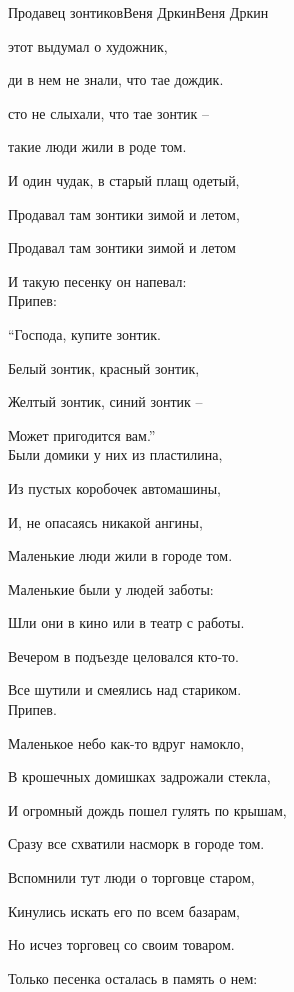 \documentclass[11pt,a5paper]{book}
\newcommand{\SBChorusTagg}{Припев}
\begin{document}
\begin{song}{Продавец зонтиков}{}{Веня Дркин}{Веня Дркин}{}{}

 этот выдумал о художник,\par
{}ди в нем не знали, что тае дождик.\par
{}сто не слыхали, что тае зонтик –\par
{} такие люди жили в роде том.\par
И один чудак, в старый плащ одетый,\par
Продавал там зонтики зимой и летом,\par
Продавал там зонтики зимой и летом\par
И такую песенку он напевал:\\

\SBChorusTagg:\par
“Господа, купите зонтик.\par
Белый зонтик, красный зонтик,\par
Желтый зонтик, синий зонтик –\par
Может пригодится вам.”\\

Были домики у них из пластилина,\par
Из пустых коробочек автомашины,\par
И, не опасаясь никакой ангины,\par
Маленькие люди жили в городе том.\par
Маленькие были у людей заботы:\par
Шли они в кино или в театр с работы.\par
Вечером в подъезде целовался кто-то.\par
Все шутили и смеялись над стариком.\\


\SBChorusTagg.\\

\newpage

Маленькое небо как-то вдруг намокло,\par
В крошечных домишках задрожали стекла,\par
И огромный дождь пошел гулять по крышам,\par
Сразу все схватили насморк в городе том.\par
Вспомнили тут люди о торговце старом,\par
Кинулись искать его по всем базарам,\par
Но исчез торговец со своим товаром.\par
Только песенка осталась в память о нем:\\


\end{song}
\end{document}
